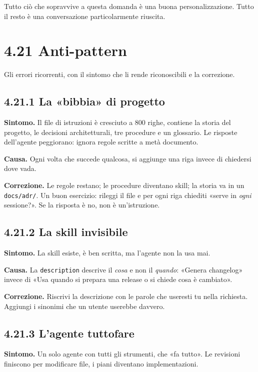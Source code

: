 \documentclass[
  italian,
  10pt,
]{book}
\begin{document}
Tutto ciò che sopravvive a questa domanda è una buona personalizzazione.
Tutto il resto è una conversazione particolarmente riuscita.

\section{4.21 Anti-pattern}\label{anti-pattern}

Gli errori ricorrenti, con il sintomo che li rende riconoscibili e la
correzione.

\subsection{4.21.1 La «bibbia» di progetto}\label{la-bibbia-di-progetto}

\textbf{Sintomo.} Il file di istruzioni è cresciuto a 800 righe,
contiene la storia del progetto, le decisioni architetturali, tre
procedure e un glossario. Le risposte dell'agente peggiorano: ignora
regole scritte a metà documento.

\textbf{Causa.} Ogni volta che succede qualcosa, si aggiunge una riga
invece di chiedersi dove vada.

\textbf{Correzione.} Le regole restano; le procedure diventano skill; la
storia va in un \texttt{docs/adr/}. Un buon esercizio: rileggi il file e
per ogni riga chiediti «serve in \emph{ogni} sessione?». Se la risposta
è no, non è un'istruzione.

\subsection{4.21.2 La skill invisibile}\label{la-skill-invisibile}

\textbf{Sintomo.} La skill esiste, è ben scritta, ma l'agente non la usa
mai.

\textbf{Causa.} La \texttt{description} descrive il \emph{cosa} e non il
\emph{quando}: «Genera changelog» invece di «Usa quando si prepara una
release o si chiede cosa è cambiato».

\textbf{Correzione.} Riscrivi la descrizione con le parole che useresti
tu nella richiesta. Aggiungi i sinonimi che un utente userebbe davvero.

\subsection{4.21.3 L'agente tuttofare}\label{lagente-tuttofare}

\textbf{Sintomo.} Un solo agente con tutti gli strumenti, che «fa
tutto». Le revisioni finiscono per modificare file, i piani diventano
implementazioni.
\end{document}
